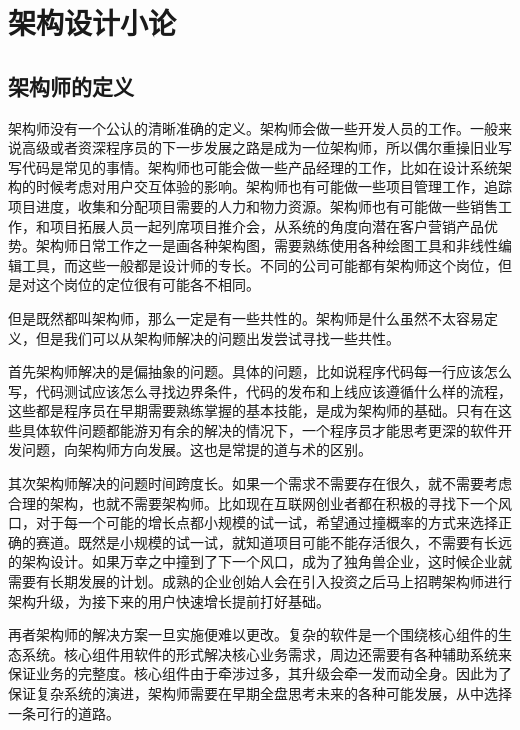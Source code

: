 \chapter{架构设计小论}


\section{架构师的定义}

架构师没有一个公认的清晰准确的定义。架构师会做一些开发人员的工作。一般来说高级或者资深程序员的下一步发展之路是成为一位架构师，所以偶尔重操旧业写写代码是常见的事情。架构师也可能会做一些产品经理的工作，比如在设计系统架构的时候考虑对用户交互体验的影响。架构师也有可能做一些项目管理工作，追踪项目进度，收集和分配项目需要的人力和物力资源。架构师也有可能做一些销售工作，和项目拓展人员一起列席项目推介会，从系统的角度向潜在客户营销产品优势。架构师日常工作之一是画各种架构图，需要熟练使用各种绘图工具和非线性编辑工具，而这些一般都是设计师的专长。不同的公司可能都有架构师这个岗位，但是对这个岗位的定位很有可能各不相同。



但是既然都叫架构师，那么一定是有一些共性的。架构师是什么虽然不太容易定义，但是我们可以从架构师解决的问题出发尝试寻找一些共性。



首先架构师解决的是偏抽象的问题。具体的问题，比如说程序代码每一行应该怎么写，代码测试应该怎么寻找边界条件，代码的发布和上线应该遵循什么样的流程，这些都是程序员在早期需要熟练掌握的基本技能，是成为架构师的基础。只有在这些具体软件问题都能游刃有余的解决的情况下，一个程序员才能思考更深的软件开发问题，向架构师方向发展。这也是常提的道与术的区别。



其次架构师解决的问题时间跨度长。如果一个需求不需要存在很久，就不需要考虑合理的架构，也就不需要架构师。比如现在互联网创业者都在积极的寻找下一个风口，对于每一个可能的增长点都小规模的试一试，希望通过撞概率的方式来选择正确的赛道。既然是小规模的试一试，就知道项目可能不能存活很久，不需要有长远的架构设计。如果万幸之中撞到了下一个风口，成为了独角兽企业，这时候企业就需要有长期发展的计划。成熟的企业创始人会在引入投资之后马上招聘架构师进行架构升级，为接下来的用户快速增长提前打好基础。



再者架构师的解决方案一旦实施便难以更改。复杂的软件是一个围绕核心组件的生态系统。核心组件用软件的形式解决核心业务需求，周边还需要有各种辅助系统来保证业务的完整度。核心组件由于牵涉过多，其升级会牵一发而动全身。因此为了保证复杂系统的演进，架构师需要在早期全盘思考未来的各种可能发展，从中选择一条可行的道路。


